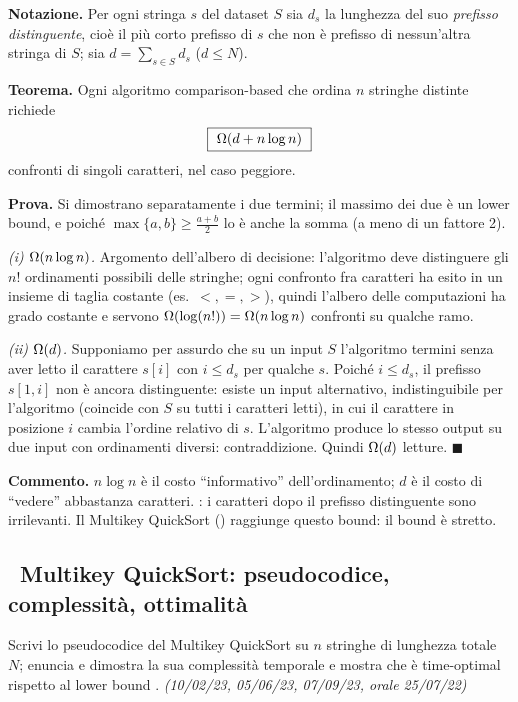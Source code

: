 \textbf{Notazione.} Per ogni stringa $s$ del dataset $S$ sia $d_s$ la lunghezza del suo
\emph{prefisso distinguente}, cio\`e il pi\`u corto prefisso di $s$ che non \`e prefisso di
nessun'altra stringa di $S$; sia $d=\sum_{s\in S} d_s$ ($d\le N$).

\textbf{Teorema.} Ogni algoritmo comparison-based che ordina $n$ stringhe distinte richiede
\[
\boxed{\ \Om{d+n\log n}\ }
\]
confronti di singoli caratteri, nel caso peggiore.

\textbf{Prova.} Si dimostrano separatamente i due termini; il massimo dei due \`e un lower bound,
e poich\'e $\max\{a,b\}\ge\frac{a+b}{2}$ lo \`e anche la somma (a meno di un fattore 2).

\emph{(i) $\Omega\!\left(n\log n\right)$.} Argomento dell'albero di decisione: l'algoritmo deve distinguere gli
$n!$ ordinamenti possibili delle stringhe; ogni confronto fra caratteri ha esito in un insieme di
taglia costante (es.\ $<,=,>$), quindi l'albero delle computazioni ha grado costante e servono
$\Omega\!\left(\log(n!)\right)=\Omega\!\left(n\log n\right)$ confronti su qualche ramo.

\emph{(ii) $\Omega\!\left(d\right)$.}  Supponiamo per assurdo che su un input $S$ l'algoritmo termini senza aver letto il
carattere $s[i]$ con $i\le d_s$ per qualche $s$. Poich\'e $i\le d_s$, il prefisso $s[1,i]$ non \`e
ancora distinguente: esiste un input alternativo, indistinguibile per l'algoritmo (coincide con $S$
su tutti i caratteri letti), in cui il carattere in posizione $i$ cambia l'ordine relativo di $s$.
L'algoritmo produce lo stesso output su due input con ordinamenti diversi: contraddizione. Quindi
$\Omega\!\left(d\right)$ letture. $\blacksquare$

\textbf{Commento.} $n\log n$ \`e il costo ``informativo'' dell'ordinamento; $d$ \`e il costo di
``vedere'' abbastanza caratteri. : i caratteri dopo il prefisso distinguente
sono irrilevanti. Il Multikey QuickSort () raggiunge questo bound: il bound \`e stretto.

\subsection*{\hot\ Multikey QuickSort: pseudocodice, complessit\`a, ottimalit\`a}

\begin{domanda}
Scrivi lo pseudocodice del Multikey QuickSort su $n$ stringhe di lunghezza totale $N$; enuncia e
dimostra la sua complessit\`a temporale e mostra che \`e time-optimal rispetto al lower bound
. \emph{(10/02/23, 05/06/23, 07/09/23, orale 25/07/22)}
\end{domanda}


